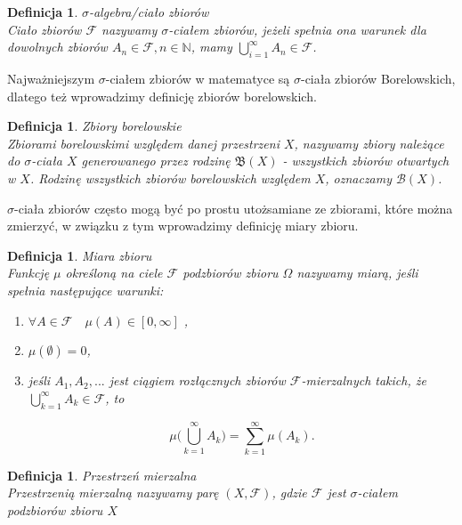 \documentclass[12pt,a4paper]{report}
\newtheorem{definition}[theorem]{Definicja}
\begin{document}
\begin{definition}{$\sigma$-algebra/ciało zbiorów\cite[Rozdział 8.1]{rudnicki2006}}\\
Ciało zbiorów $\mathcal{F}$ nazywamy $\sigma$-ciałem zbiorów, jeżeli spełnia ona warunek
dla dowolnych zbiorów $A_{n} \in \mathcal{F}, n \in \mathbb{N}$, mamy
$\bigcup\limits_{i=1}^{\infty} A_n \in \mathcal{F}$.
\end{definition}
Najważniejszym $\sigma$-ciałem zbiorów w matematyce są $\sigma$-ciała zbiorów Borelowskich, dlatego też wprowadzimy definicję zbiorów borelowskich. 



\begin{definition}{Zbiory borelowskie \cite[w opraciu o rozdział 2]{billingsley1987}}\\
Zbiorami borelowskimi względem danej przestrzeni $X$, nazywamy zbiory należące do $\sigma$-ciała $X$ generowanego przez rodzinę $\mathfrak{B}(X)$ - wszystkich zbiorów otwartych w $X$. Rodzinę wszystkich zbiorów borelowskich względem $X$, oznaczamy $\mathcal{B}(X)$.
\end{definition}

$\sigma$-ciała zbiorów często mogą być po prostu utożsamiane ze zbiorami, które można zmierzyć, w związku z tym wprowadzimy definicję miary zbioru.

\begin{definition}{Miara zbioru \cite[Rozdział 2.10] {billingsley1987}}\\
Funkcję $\mu$ określoną na ciele $\mathcal{F}$ podzbiorów zbioru $\Omega$ nazywamy miarą, jeśli spełnia następujące warunki: 
\begin{enumerate}
\item $\forall{\textit{A} \in \mathcal{F}} \quad \mu(A) \in [0, \infty]$ ,
\item $\mu(\emptyset)=0$,
\item jeśli $A_1, A_2,...$ jest ciągiem rozłącznych zbiorów $\mathcal{F}$-mierzalnych takich, że $\bigcup\limits_{k=1}^{\infty} A_k \in \mathcal{F}$, to 

$$\mu\big(\bigcup\limits_{k=1}^{\infty} A_k\big)=\sum_{k=1}^{\infty} \mu(A_k).$$

\end{enumerate}
\end{definition}


\begin{definition}{Przestrzeń mierzalna \cite[Rozdział 2.10]{billingsley1987}}\\
Przestrzenią mierzalną nazywamy parę $(X, \mathcal{F})$, gdzie $\mathcal{F}$ jest $\sigma$-ciałem podzbiorów zbioru $X$
\end{definition}
\end{document}
